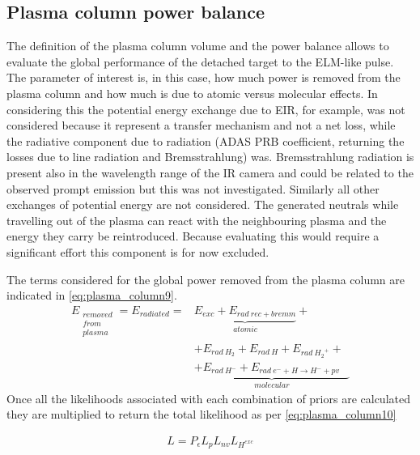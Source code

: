 \subsection{Plasma column power balance}\label{Plasma column power balance}

The definition of the plasma column volume and the power balance allows to evaluate the global performance of the detached target to the ELM-like pulse. The parameter of interest is, in this case, how much power is removed from the plasma column and how much is due to atomic versus molecular effects.
In considering this the potential energy exchange due to EIR, for example, was not considered because it represent a transfer mechanism and not a net loss, while the radiative component due to radiation (ADAS PRB coefficient, returning the losses due to line radiation and Bremsstrahlung) was. Bremsstrahlung radiation is present also in the wavelength range of the IR camera and could be related to the observed prompt emission but this was not investigated. Similarly all other exchanges of potential energy are not considered. The generated neutrals while travelling out of the plasma can react with the neighbouring plasma and the energy they carry be reintroduced. Because evaluating this would require a significant effort this component is for now excluded.

The terms considered for the global power removed from the plasma column are indicated in \autoref{eq:plasma_column9}.
\begin{equation}
\label{eq:plasma_column9}
\begin{aligned}
 E_{ \substack{removed \\ from \\ plasma}} = E_{ radiated } =& \underbrace{E_{exc} + E_{rad\ rec+bremm}}_{atomic} +\\&+ E_{rad\ {H_2} } + E_{rad\ {H}} + E_{rad\ {H_2}^{+{}} } +\\& \underbrace{ +E_{rad\ {H}^{-{}} } + E_{rad\ e^-{}+H \rightarrow {H}^{-{}}+pv \phantom{+}}}_{ molecular }
\end{aligned}
\end{equation}
Once all the likelihoods associated with each combination of priors are calculated they are multiplied to return the total likelihood as per \autoref{eq:plasma_column10}

\begin{equation}
\label{eq:plasma_column10}
\begin{aligned}
L = P_{\epsilon} L_p L_{nv} L_{H^{exc}}
\end{aligned}
\end{equation}

